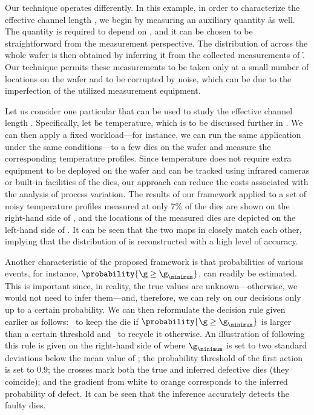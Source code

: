 Our technique operates differently. In this example, in order to characterize
the effective channel length \g, we begin by measuring an auxiliary quantity \h
as well. The quantity is required to depend on \g, and it can be chosen to be
straightforward from the measurement perspective. The distribution of \g across
the whole wafer is then obtained by inferring it from the collected measurements
of \h. Our technique permits these measurements to be taken only at a small
number of locations on the wafer and to be corrupted by noise, which can be due
to the imperfection of the utilized measurement equipment.

Let us consider one particular \h that can be used to study the effective
channel length \g. Specifically, let \h be temperature, which is to be discussed
further in . We can then apply a fixed workload---for
instance, we can run the same application under the same conditions---to a few
dies on the wafer and measure the corresponding temperature profiles. Since
temperature does not require extra equipment to be deployed on the wafer and can
be tracked using infrared cameras \cite{mesa-martinez2007} or built-in
facilities of the dies, our approach can reduce the costs associated with the
analysis of process variation. The results of our framework applied to a set of
noisy temperature profiles measured at only 7\% of the dies are shown on the
right-hand side of , and the locations of the measured
dies are depicted on the left-hand side of . It can
be seen that the two maps in  closely match each other,
implying that the distribution of \g is reconstructed with a high level of
accuracy.

Another characteristic of the proposed framework is that probabilities of
various events, for instance, $\probability{\g \geq \g_\minimum}$, can readily
be estimated. This is important since, in reality, the true values are
unknown---otherwise, we would not need to infer them---and, therefore, we can
rely on our decisions only up to a certain probability. We can then reformulate
the decision rule given earlier as follows: \one~to keep the die if
$\probability{\g \geq \g_\minimum}$ is larger than a certain threshold and
\two~to recycle it otherwise. An illustration of following this rule is given on
the right-hand side of  where $\g_\minimum$ is set
to two standard deviations below the mean value of \g; the probability threshold
of the first action is set to 0.9; the crosses mark both the true and inferred
defective dies (they coincide); and the gradient from white to orange
corresponds to the inferred probability of defect. It can be seen that the
inference accurately detects the faulty dies.

